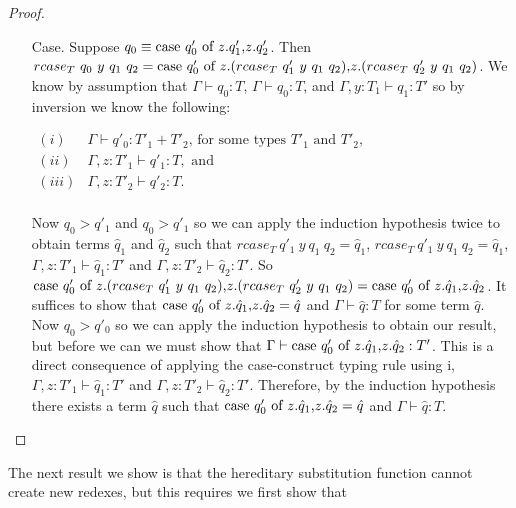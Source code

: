 \begin{proof}
\begin{itemize}
\begin{itemize}
\begin{itemize}
    \item[Case.] Suppose $q_0 \equiv \mbox{case}\ q'_0\ \text{of}\ z\text{.}q'_1\text{,}z\text{.}q'_2$.  Then \\
      $rcase_{T}\ q_0\ y\ q_1\ q_2 = \ccon{q'_0}{z}{(rcase_{T}\ q'_1\ y\ q_1\ q_2)}{(rcase_{T}\ q'_2\ y\ q_1\ q_2)}$.
      We know by assumption that $\Gamma \vdash q_0:T$, $\Gamma \vdash q_0:T$, and $\Gamma, y:T_1 \vdash q_1:T'$
      so by inversion we know the following:
      \begin{center}
        \begin{math}
          \begin{array}{lll}
            (i) & \Gamma \vdash q'_0:T'_1 + T'_2 \text{, for some types } T'_1 \text{ and } T'_2,\\
            (ii) & \Gamma, z:T'_1 \vdash q'_1:T, \text{ and }\\
            (iii) & \Gamma, z:T'_2 \vdash q'_2:T.\\
          \end{array}
        \end{math}
      \end{center}
      Now $q_0 > q'_1$ and $q_0 > q'_1$ so we can apply the induction hypothesis twice to obtain terms $\hat{q}_1$ and
      $\hat{q}_2$ such that $rcase_{T}\ q'_1\ y\ q_1\ q_2 = \hat{q}_1$, $rcase_{T}\ q'_1\ y\ q_1\ q_2 = \hat{q}_1$,
      $\Gamma, z:T'_1 \vdash \hat{q}_1:T'$ and $\Gamma, z:T'_2 \vdash \hat{q}_2:T'$. So
      $\ccon{q'_0}{z}{(rcase_{T}\ q'_1\ y\ q_1\ q_2)}{(rcase_{T}\ q'_2\ y\ q_1\ q_2)} = 
      \ccon{q'_0}{z}{\hat{q}_1}{\hat{q}_2}$.  It suffices to show that $\mbox{case}\ q'_0\ \text{of}\ z\text{.}\hat{q}_1\text{,}z\text{.}\hat{q}_2 = \hat{q}$ 
      and $\Gamma \vdash \hat{q}:T$ for some term $\hat{q}$.  Now $q_0 > q'_0$ so we can apply the induction hypothesis
      to obtain our result, but before we can we must show that $\Gamma \vdash \mbox{case}\ q'_0\ \text{of}\ z\text{.}\hat{q}_1\text{,}z\text{.}\hat{q}_2:T'$.
      This is a direct consequence of applying the case-construct typing rule using i, $\Gamma, z:T'_1 \vdash \hat{q}_1:T'$
      and $\Gamma, z:T'_2 \vdash \hat{q}_2:T'$.  Therefore, by the induction hypothesis there exists a term $\hat{q}$ 
      such that $\mbox{case}\ q'_0\ \text{of}\ z\text{.}\hat{q}_1\text{,}z\text{.}\hat{q}_2 = \hat{q}$ and $\Gamma \vdash \hat{q}:T$.
    \end{itemize}
  \end{itemize}
\end{itemize}
\end{proof}
The next result we show is that the hereditary substitution function
cannot create new redexes, but this requires we first show that
